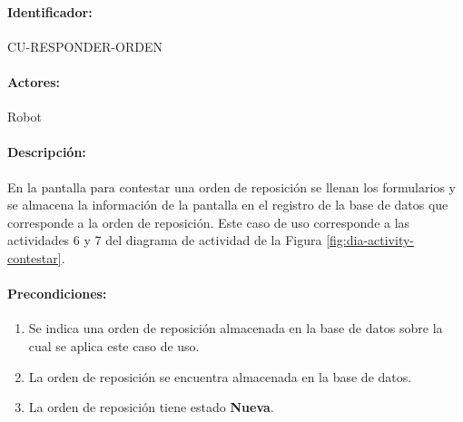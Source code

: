 \paragraph{Identificador:}
CU-RESPONDER-ORDEN
\paragraph{Actores:}
Robot
\paragraph{Descripción:}
En la pantalla para contestar una orden de reposición se llenan los formularios y se almacena la información de la pantalla en el registro de la base de datos que corresponde a la orden de reposición. Este caso de uso corresponde a las actividades 6 y 7 del diagrama de actividad de la Figura \ref{fig:dia-activity-contestar}.
\paragraph{Precondiciones:}
\begin{enumerate}
  \item Se indica una orden de reposición almacenada en la base de datos sobre la cual se aplica este caso de uso.
  \item La orden de reposición se encuentra almacenada en la base de datos.
  \item La orden de reposición tiene estado \textbf{Nueva}.
\end{enumerate}
